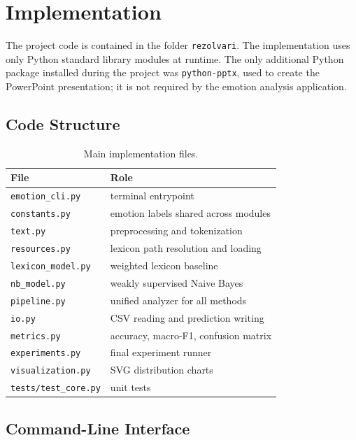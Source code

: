 \section{Implementation}

The project code is contained in the folder \texttt{rezolvari}. The implementation uses only Python standard library modules at runtime. The only additional Python package installed during the project was \texttt{python-pptx}, used to create the PowerPoint presentation; it is not required by the emotion analysis application.

\subsection{Code Structure}

\begin{table}[h]
\centering
\small
\begin{tabular}{ll}
\toprule
\textbf{File} & \textbf{Role} \\
\midrule
\texttt{emotion\_cli.py} & terminal entrypoint \\
\texttt{constants.py} & emotion labels shared across modules \\
\texttt{text.py} & preprocessing and tokenization \\
\texttt{resources.py} & lexicon path resolution and loading \\
\texttt{lexicon\_model.py} & weighted lexicon baseline \\
\texttt{nb\_model.py} & weakly supervised Naive Bayes \\
\texttt{pipeline.py} & unified analyzer for all methods \\
\texttt{io.py} & CSV reading and prediction writing \\
\texttt{metrics.py} & accuracy, macro-F1, confusion matrix \\
\texttt{experiments.py} & final experiment runner \\
\texttt{visualization.py} & SVG distribution charts \\
\texttt{tests/test\_core.py} & unit tests \\
\bottomrule
\end{tabular}
\caption{Main implementation files.}
\label{tab:files}
\end{table}

\subsection{Command-Line Interface}

